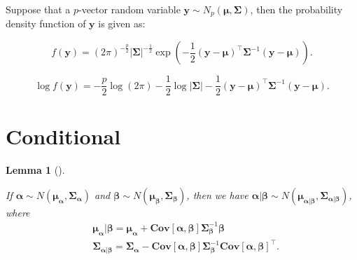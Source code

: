 \documentclass[
  a4paper,
  oneside,
  openany,
  12pt,
  onecolumn,
  twoside]{book}
\theoremstyle{plain}
\newtheorem{lemma}{Lemma}[chapter]
\theoremstyle{remark}
\begin{document}
Suppose that a \(p\)-vector random variable
\(\boldsymbol{y} \sim N_p(\boldsymbol{\mu},\mathbf{\Sigma})\), then the
probability density function of \(\boldsymbol{y}\) is given as:

\[f(\boldsymbol{y}) = (2\pi)^{-\frac{p}{2}}|\boldsymbol{\Sigma}|^{-\frac{1}{2}}\exp\left(-\frac{1}{2}(\boldsymbol{y}-\boldsymbol{\mu})^\top\boldsymbol{\Sigma}^{-1}(\boldsymbol{y}-\boldsymbol{\mu})\right).\]

\[\log f(\boldsymbol{y}) = -\frac{p}{2}\log(2\pi)-\frac{1}{2}\log|\boldsymbol{\Sigma}|-\frac{1}{2}(\boldsymbol{y}-\boldsymbol{\mu})^\top\boldsymbol{\Sigma}^{-1}(\boldsymbol{y}-\boldsymbol{\mu}).\]

\section{Conditional}\label{conditional}

\begin{lemma}[]\protect\hypertarget{lem-cond}{}\label{lem-cond}

If
\(\boldsymbol{\alpha}\sim N(\boldsymbol{\mu}_{\boldsymbol{\alpha}},\boldsymbol{\Sigma_{\boldsymbol{\alpha}}})\)
and
\(\boldsymbol{\beta}\sim N(\boldsymbol{\mu}_{\boldsymbol{\beta}},\boldsymbol{\Sigma}_{\boldsymbol{\beta}})\),
then we have
\(\boldsymbol{\alpha}|\boldsymbol{\beta}\sim N(\boldsymbol{\mu}_{\boldsymbol{\alpha}|\boldsymbol{\beta}},\boldsymbol{\Sigma}_{\boldsymbol{\alpha}|\boldsymbol{\beta}})\),
where \[
\begin{align*}
& \boldsymbol{\mu}_{\boldsymbol{\alpha}}|\boldsymbol{\beta}=\boldsymbol{\mu}_{\boldsymbol{\alpha}}+\boldsymbol{Cov}[\boldsymbol{\alpha},\boldsymbol{\beta}]\boldsymbol{\Sigma}_{\boldsymbol{\beta}}^{-1}\boldsymbol{\beta}\\
& \boldsymbol{\Sigma}_{\boldsymbol{\alpha}|\boldsymbol{\beta}}= \boldsymbol{\Sigma}_{\boldsymbol{\alpha}}-\boldsymbol{Cov}[\boldsymbol{\alpha},\boldsymbol{\beta}]\boldsymbol{\Sigma}_{\boldsymbol{\beta}}^{-1}\boldsymbol{Cov}[\boldsymbol{\alpha},\boldsymbol{\beta}]^\top.
\end{align*}
\]

\end{lemma}
\end{document}
